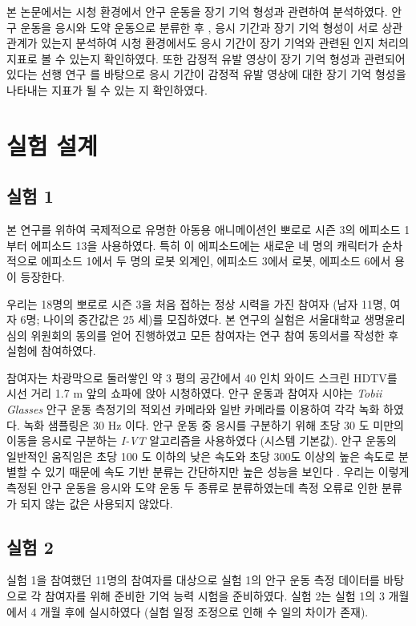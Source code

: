 \documentclass{kcc}
\begin{document}
본 논문에서는 시청 환경에서 안구 운동을 장기 기억 형성과 관련하여 분석하였다. 안구 운동을 응시와 도약 운동으로 분류한 후 \cite{Findlay1999,Feng2003,Feng2006}, 응시 기간과 장기 기억 형성이 서로 상관 관계가 있는지 분석하여 시청 환경에서도 응시 기간이 장기 기억와 관련된 인지 처리의 지표로 볼 수 있는지 확인하였다. 또한 감정적 유발 영상이 장기 기억 형성과 관련되어 있다는 선행 연구 \cite{Cahill1996amyg,Cahill1998baso}를 바탕으로 응시 기간이 감정적 유발 영상에 대한 장기 기억 형성을 나타내는 지표가 될 수 있는 지 확인하였다. 

\section{실험 설계}

\subsection{실험 1}
본 연구를 위하여 국제적으로 유명한 아동용 애니메이션인 뽀로로 시즌 3의 에피소드 1 부터 에피소드 13을 사용하였다. 특히 이 에피소드에는 새로운 네 명의 캐릭터가 순차적으로 에피소드 1에서 두 명의 로봇 외계인, 에피소드 3에서 로봇, 에피소드 6에서 용이 등장한다.

우리는 18명의 뽀로로 시즌 3을 처음 접하는 정상 시력을 가진 참여자 (남자 11명, 여자 6명; 나이의 중간값은 25 세)를 모집하였다. 본 연구의 실험은 서울대학교 생명윤리 심의 위원회의 동의를 얻어 진행하였고 모든 참여자는 연구 참여 동의서를 작성한 후 실험에 참여하였다.

참여자는 차광막으로 둘러쌓인 약 3 평의 공간에서 40 인치 와이드 스크린 HDTV를 시선 거리 1.7 m 앞의 쇼파에 앉아 시청하였다. 안구 운동과 참여자 시야는 \textit{Tobii Glasses} 안구 운동 측정기의 적외선 카메라와 일반 카메라를 이용하여 각각 녹화 하였다. 녹화 샘플링은 30 Hz 이다. 안구 운동 중 응시를 구분하기 위해 초당 30 도 미만의 이동을 응시로 구분하는 \textit{I-VT} 알고리즘을 사용하였다 (시스템 기본값). 안구 운동의 일반적인 움직임은 초당 100 도 이하의 낮은 속도와 초당 300도 이상의 높은 속도로 분별할 수 있기 때문에 속도 기반 분류는 간단하지만 높은 성능을 보인다 \cite{Salvucci2000}. 우리는 이렇게 측정된 안구 운동을 응시와 도약 운동 두 종류로 분류하였는데 측정 오류로 인한 분류가 되지 않는 값은 사용되지 않았다. 


\subsection{실험 2}
\label{subsec:experiment2}
실험 1을 참여했던 11명의 참여자를 대상으로 실험 1의 안구 운동 측정 데이터를 바탕으로 각 참여자를 위해 준비한 기억 능력 시험을 준비하였다. 실험 2는 실험 1의 3 개월에서 4 개월 후에 실시하였다 (실험 일정 조정으로 인해 수 일의 차이가 존재).
\end{document}

